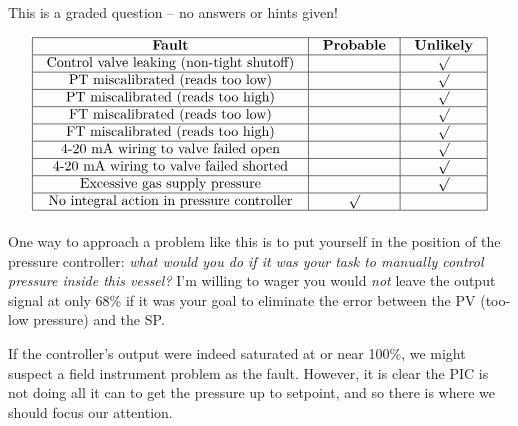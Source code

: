 \vfil 

\eject






This is a graded question -- no answers or hints given!








$$\vbox{\offinterlineskip
\halign{\strut
\vrule \quad\hfil # \ \hfil & 
\vrule \quad\hfil # \ \hfil & 
\vrule \quad\hfil # \ \hfil \vrule \cr
\noalign{\hrule}
%
{\bf Fault} & {\bf Probable} & {\bf Unlikely} \cr
%
\noalign{\hrule}
%
Control valve leaking (non-tight shutoff) &  & $\surd$ \cr
%
\noalign{\hrule}
%
PT miscalibrated (reads too low) &  & $\surd$ \cr
%
\noalign{\hrule}
%
PT miscalibrated (reads too high) &  & $\surd$ \cr
%
\noalign{\hrule}
%
FT miscalibrated (reads too low) &  & $\surd$ \cr
%
\noalign{\hrule}
%
FT miscalibrated (reads too high) &  & $\surd$ \cr
%
\noalign{\hrule}
%
4-20 mA wiring to valve failed open &  & $\surd$ \cr
%
\noalign{\hrule}
%
4-20 mA wiring to valve failed shorted &  & $\surd$ \cr
%
\noalign{\hrule}
%
Excessive gas supply pressure &  & $\surd$ \cr
%
\noalign{\hrule}
%
No integral action in pressure controller & $\surd$ & \cr
%
\noalign{\hrule}
} %
}$$ %

One way to approach a problem like this is to put yourself in the position of the pressure controller: {\it what would you do if it was your task to manually control pressure inside this vessel?}  I'm willing to wager you would {\it not} leave the output signal at only 68\% if it was your goal to eliminate the error between the PV (too-low pressure) and the SP.

\vskip 10pt

If the controller's output were indeed saturated at or near 100\%, we might suspect a field instrument problem as the fault.  However, it is clear the PIC is not doing all it can to get the pressure up to setpoint, and so there is where we should focus our attention.

